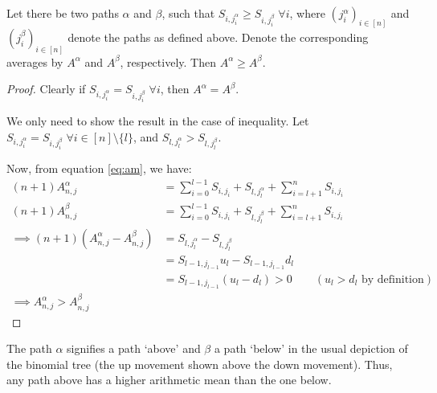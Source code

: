 \begin{thm}
	\label{thm:sp-up-dn-path}
	Let there be two paths $\alpha$ and $\beta$, such that $S_{i,j_i^\alpha} \geq S_{i,j_i^\beta} \; \forall i$, where $ ( j_i^\alpha )_{i \in [n]} $ and $ ( j_i^\beta )_{i \in [n]} $ denote the paths as defined above. Denote the corresponding averages by $A^\alpha$ and $A^\beta$, respectively. Then $ A^\alpha \geq A^\beta $.
\end{thm}

\begin{proof}
	Clearly if $S_{i,j_i^\alpha} = S_{i,j_i^\beta} \; \forall i$, then $A^\alpha = A^\beta$.
	
	We only need to show the result in the case of inequality.
	Let $ S_{i,j_i^\alpha} = S_{i,j_i^\beta} \; \forall i \in [n] \setminus \{l\} $, and $ S_{l,j_l^\alpha} > S_{l,j_l^\beta}$.
	
	Now, from equation \ref{eq:am}, we have:
	\begin{align*}
		(n+1) A_{n,j}^\alpha &= \sum_{i=0}^{l-1} S_{i,j_i} + S_{l,j_l^\alpha} + \sum_{i=l+1}^{n} S_{i,j_i} \\
		(n+1) A_{n,j}^\beta &= \sum_{i=0}^{l-1} S_{i,j_i} + S_{l,j_l^\beta} + \sum_{i=l+1}^{n} S_{i,j_i} \\
		\implies (n+1) \left(A_{n,j}^\alpha - A_{n,j}^\beta\right) &= S_{l,j_l^\alpha} - S_{l,j_l^\beta} \\
												 &= S_{l-1,j_{l-1}} u_l - S_{l-1,j_{l-1}} d_l \\
												 &= S_{l-1,j_{l-1}} (u_l - d_l) > 0 \qquad (u_l > d_l \text{ by definition}) \\
		\implies A_{n,j}^\alpha > A_{n,j}^\beta
	\end{align*}
\end{proof}


\begin{rem}
	The path $\alpha$ signifies a path `above' and $\beta$ a path `below' in the usual depiction of the binomial tree (the up movement shown above the down movement). Thus, any path above	 has a higher arithmetic mean than the one below.
\end{rem}


